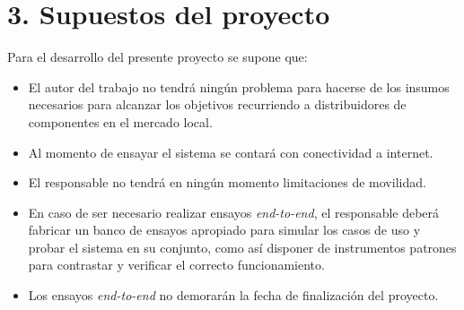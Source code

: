 \documentclass[11pt]{charter}
\begin{document}
\section{3. Supuestos del proyecto}
\label{sec:supuestos}
Para el desarrollo del presente proyecto se supone que:
\begin{itemize}
	\item El autor del trabajo no tendrá ningún problema para hacerse de los insumos necesarios para alcanzar los objetivos recurriendo a distribuidores de componentes en el mercado local.
	\item Al momento de ensayar el sistema se contará con conectividad a internet.
	\item El responsable no tendrá en ningún momento limitaciones de movilidad.
	\item En caso de ser necesario realizar ensayos \textit{end-to-end}, el responsable deberá fabricar un banco de ensayos apropiado para simular los casos de uso y probar el sistema en su conjunto, como así disponer de instrumentos patrones para contrastar y verificar el correcto funcionamiento.
	\item Los ensayos \textit{end-to-end} no demorarán la fecha de finalización del proyecto.
\end{itemize}
\end{document}
